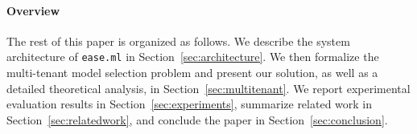 \documentclass[letterpaper]{vldb}
\newcommand{\eml}{\texttt{ease.ml}\xspace}
\begin{document}
\vspace{-1em}
\paragraph*{Overview}
The rest of this paper is organized as follows.
We describe the system architecture of \eml in Section~\ref{sec:architecture}.
We then formalize the multi-tenant model selection problem and present our solution, as well as a detailed theoretical analysis, in Section~\ref{sec:multitenant}.
We report experimental evaluation results in Section~\ref{sec:experiments}, summarize related work in Section~\ref{sec:relatedwork}, and conclude the paper in Section~\ref{sec:conclusion}.





\end{document}
